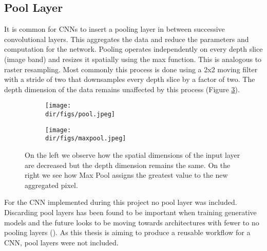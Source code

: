 \subsection{Pool Layer}
It is common for CNNs to insert a pooling layer in between successive convolutional layers. This aggregates the data and reduce the parameters and computation for the network. Pooling operates independently on every depth slice (image band) and resizes it spatially using the max function. This is analogous to raster resampling. Most commonly this process is done using a 2x2 moving filter with a stride of two that downsamples every depth slice by a factor of two. The depth dimension of the data remains unaffected by this process (Figure \ref{fig.pooling}).
\begin{figure}[H]
\centering
\begin{subfigure}{0.45\textwidth}
\texttt{[image: \\dir/figs/pool.jpeg]}
\caption{}
\label{fig.pool}
\end{subfigure}%
\qquad
\begin{subfigure}{0.45\textwidth}
\texttt{[image: \\dir/figs/maxpool.jpeg]}
\caption{}
\label{fig.maxpool}
\end{subfigure}
\caption[Example of pooling and Max Pool function]{On the left we observe how the spatial dimensions of the input layer are decreased but the depth dimension remains the same. On the right we see how Max Pool assigns the greatest value to the new aggregated pixel.}
\label{fig.pooling}
\end{figure}
\par
For the CNN implemented during this project no pool layer was included. Discarding pool layers has been found to be important when training generative models and the future looks to be moving towards architectures with fewer to no pooling layers (\cite{Springenberg14}). As this thesis is aiming to produce a reusable workflow for a CNN, pool layers were not included. 

